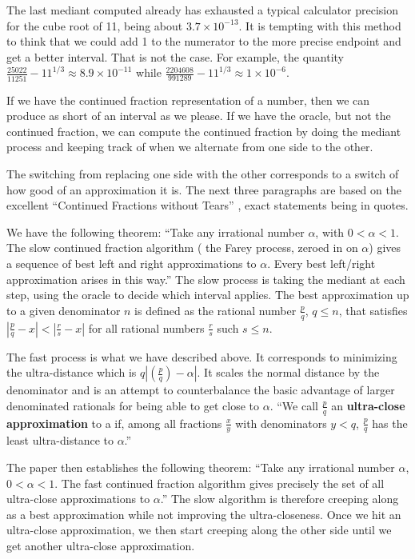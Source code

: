 \documentclass[12pt]{article}
\theoremstyle{remark}
\begin{document}
The last mediant computed already has exhausted a typical calculator precision for the cube root of 11, being about $3.7\times 10^{-13}$. It is tempting with this method to think that we could add 1 to the numerator to the more precise endpoint and get a better interval. That is not the case. For example, the quantity $\frac{25022}{11251} - 11^{1/3} \approx 8.9\times 10^{-11}$ while $\frac{2204608}{991289} - 11^{1/3} \approx 1\times10^{-6}$. 

If we have the continued fraction representation of a number, then we can produce as short of an interval as we please. If we have the oracle, but not the continued fraction, we can compute the continued fraction by doing the mediant process and keeping track of when we alternate from one side to the other. 

The switching from replacing one side with the other corresponds to a switch of how good of an approximation it is. The next three paragraphs are based on the excellent ``Continued Fractions without Tears'' \cite{richards}, exact statements being in quotes.  

We have the following theorem: ``Take any irrational number $\alpha$, with $0 < \alpha < 1$. The slow continued fraction algorithm ( the Farey process, zeroed in on $\alpha$) gives a sequence of best left and right approximations to $\alpha$. Every best left/right approximation arises in this way.'' The slow process is taking the mediant at each step, using the oracle to decide which interval applies. The best approximation up to a given denominator $n$ is defined as the rational number $\frac{p}{q}$, $q  \leq n$, that satisfies $|\frac{p}{q} - x | < |\frac{r}{s} -x|$ for all rational numbers $\frac{r}{s}$ such $s \leq n$.


The fast process is what we have described above. It corresponds to minimizing the ultra-distance which is $q|(\frac{p}{q})-\alpha|$. It scales the normal distance by the denominator and is an attempt to counterbalance the basic advantage of larger denominated rationals for being able to get close to $\alpha$.  ``We call $\frac{p}{q}$ an \textbf{ultra-close approximation} to a if, among all fractions $\frac{x}{y}$ with denominators $y < q$, $\frac{p}{q}$ has the least ultra-distance to $\alpha$.''

The paper then establishes the following theorem: ``Take any irrational number $\alpha$, $0 < \alpha < 1$. The fast continued fraction algorithm gives precisely the set of all ultra-close approximations to $\alpha$.''  The slow algorithm is therefore creeping along as a best approximation while not improving the ultra-closeness. Once we hit an ultra-close approximation, we then start creeping along the other side until we get another ultra-close approximation. 
\end{document}
